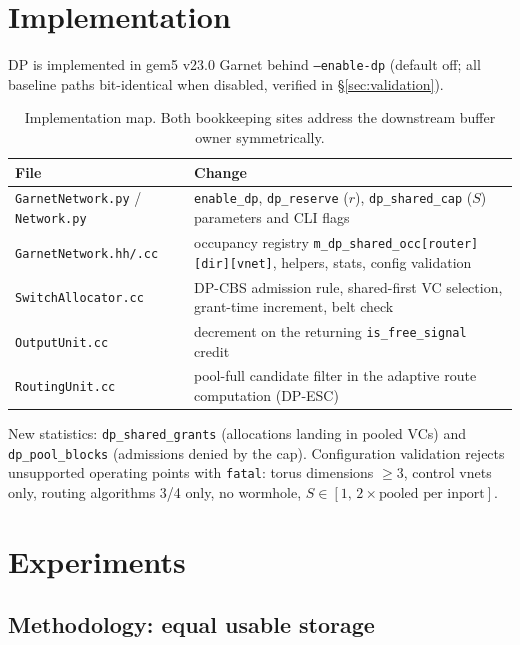 \documentclass[10pt]{article}
\begin{document}
\section{Implementation}
\label{sec:impl}

DP is implemented in gem5 v23.0 Garnet behind \texttt{--enable-dp}
(default off; all baseline paths bit-identical when disabled, verified in
\S\ref{sec:validation}).

\begin{table}[H]
\centering
\small
\begin{tabular}{lp{}}
\toprule
File & Change \\
\midrule
\texttt{GarnetNetwork.py} / \texttt{Network.py} &
  \texttt{enable\_dp}, \texttt{dp\_reserve} ($r$), \texttt{dp\_shared\_cap}
  ($S$) parameters and CLI flags \\
\texttt{GarnetNetwork.hh/.cc} &
  occupancy registry \texttt{m\_dp\_shared\_occ[router][dir][vnet]},
  helpers, stats, config validation \\
\texttt{SwitchAllocator.cc} &
  DP-CBS admission rule, shared-first VC selection, grant-time
  increment, belt check \\
\texttt{OutputUnit.cc} &
  decrement on the returning \texttt{is\_free\_signal} credit \\
\texttt{RoutingUnit.cc} &
  pool-full candidate filter in the adaptive route computation (DP-ESC) \\
\bottomrule
\end{tabular}
\caption{Implementation map. Both bookkeeping sites address the
downstream buffer owner symmetrically.}
\label{tab:impl}
\end{table}

New statistics: \texttt{dp\_shared\_grants} (allocations landing in
pooled VCs) and \texttt{dp\_pool\_blocks} (admissions denied by the cap).
Configuration validation rejects unsupported operating points with
\texttt{fatal}: torus dimensions $\ge 3$, control vnets only, routing
algorithms 3/4 only, no wormhole, $S \in [1,\, 2\times\text{pooled per
inport}]$.

\section{Experiments}
\label{sec:experiments}

\subsection{Methodology: equal usable storage}
\end{document}
